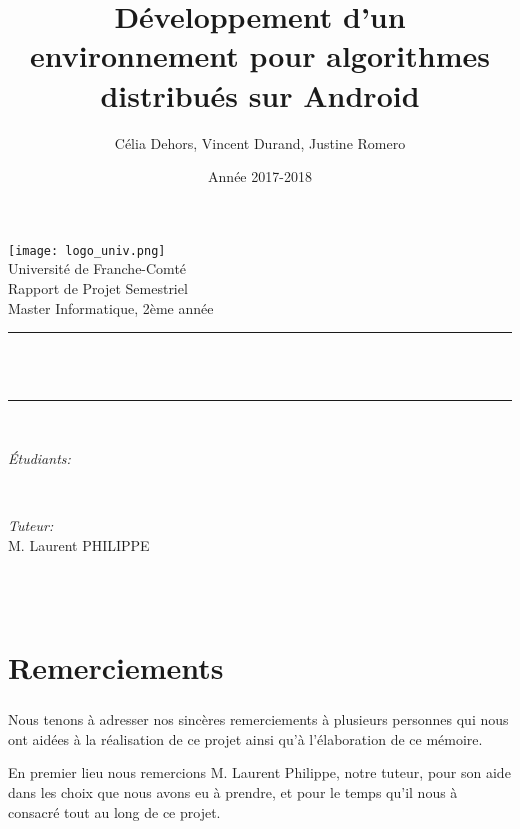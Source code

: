 \documentclass[a4paper,10pt]{report}
\title{Développement d'un environnement pour algorithmes distribués sur Android}
\author{Célia Dehors, Vincent Durand, Justine Romero}
\date{Année 2017-2018}
\makeatletter
\let\thetitle\@title
\let\theauthor\@author
\let\thedate\@date
\makeatother
\begin{document}
  
  \begin{titlepage}
    \centering
    \vspace*{0.5 cm}
    \texttt{[image: logo\_univ.png]}\\[1.0 cm]   %
    \LARGE Université de Franche-Comté\\[2.0 cm]   %
    \Large Rapport de Projet Semestriel\\               %
    \large Master Informatique, 2ème année\\[2.5 cm]               %
    \rule{\linewidth}{0.2 mm} \\[2.5 mm]
    { \huge \bfseries \thetitle}\\
    \rule{\linewidth}{0.2 mm} \\[2.0 cm]
    
    \begin{minipage}{0.6\textwidth}
        \begin{flushleft} \large
            \emph{Étudiants:}\\
            \theauthor
        \end{flushleft}
    \end{minipage}~
    \begin{minipage}{0.4\textwidth}
        \begin{flushleft} \large
            \emph{Tuteur:}\\
            M. Laurent PHILIPPE
        \end{flushleft}
    \end{minipage}\\[3.0 cm]
    {\large \thedate}\\[2 cm]
    \vfill
    
\end{titlepage}
\chapter*{Remerciements}
\paragraph{}
Nous tenons à adresser nos sincères remerciements à plusieurs personnes qui nous ont aidées à la réalisation de ce projet ainsi qu'à l'élaboration de ce mémoire.

En premier lieu nous remercions M. Laurent Philippe, notre tuteur, pour son aide dans les choix que nous avons eu à prendre, et pour le temps qu'il nous à consacré tout au long de ce projet.
\end{document}
